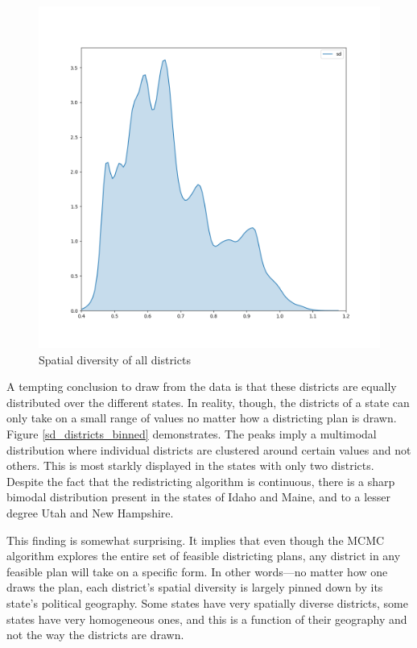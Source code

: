 \documentclass[]{article}
\begin{document}
\begin{figure}
\centering
\includegraphics{../30_results/all_districts_concat_sd.png}
\caption{Spatial diversity of all districts \label{sd_all_districts}}
\end{figure}

A tempting conclusion to draw from the data is that these districts are
equally distributed over the different states. In reality, though, the
districts of a state can only take on a small range of values no matter
how a districting plan is drawn. Figure \ref{sd_districts_binned}
demonstrates. The peaks imply a multimodal distribution where individual
districts are clustered around certain values and not others. This is
most starkly displayed in the states with only two districts. Despite
the fact that the redistricting algorithm is continuous, there is a
sharp bimodal distribution present in the states of Idaho and Maine, and
to a lesser degree Utah and New Hampshire.

This finding is somewhat surprising. It implies that even though the
MCMC algorithm explores the entire set of feasible districting plans,
any district in any feasible plan will take on a specific form. In other
words---no matter how one draws the plan, each district's spatial
diversity is largely pinned down by its state's political geography.
Some states have very spatially diverse districts, some states have very
homogeneous ones, and this is a function of their geography and not the
way the districts are drawn.
\end{document}

